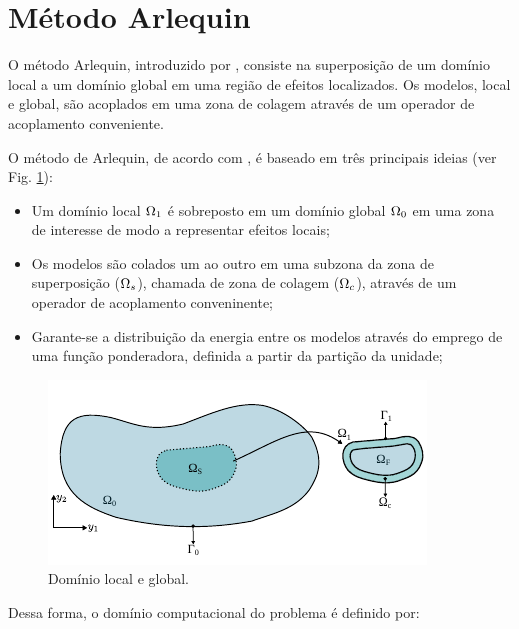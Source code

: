 \documentclass[tese_patricia]{subfiles}
\begin{document}
\section{Método Arlequin}

O método Arlequin, introduzido por , consiste na superposição de um domínio local a um domínio global em uma região de efeitos localizados. Os modelos, local e global, são acoplados em uma zona de colagem através de um operador de acoplamento conveniente.

O  método de Arlequin, de acordo com , é baseado em três principais ideias (ver Fig. \ref{fig:dominioArlequin}):

\begin{itemize}
	\item Um domínio local $\Omega_1$ é sobreposto em um domínio global  $\Omega_0$ em uma zona de interesse de modo a representar efeitos locais;
	\item Os modelos são colados um ao outro em uma subzona da zona de superposição ($\Omega_s$), chamada de zona de colagem ($\Omega_c$), através de um operador de acoplamento conveninente;
	\item  Garante-se a distribuição da energia entre os modelos através do emprego de uma função ponderadora, definida a partir da partição da unidade;
\end{itemize}

\begin{figure}[htb!]
	\centering 
	\includegraphics[scale=1.5,trim=0cm 0cm 0cm 0.0cm, clip=true]{Imagens/Cap6/dominioArlequin.pdf}	
	\caption{Domínio local e global.}
	\label{fig:dominioArlequin}
\end{figure}

Dessa forma, o domínio computacional do problema é definido por:
\end{document}
